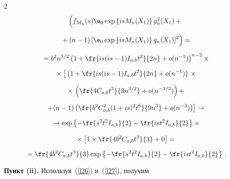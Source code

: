 \begin{multicols}{2}
\begin{multline*}
 \left(


 \vphantom{\left[X_1\right]^2}


 f_{M_n}(s) {\e}_0 \exp\left\{isM_n(X_1)\right\} g_n^2(X_1) +{}\right.\\[6pt]


\left. {}+ (n-1) \left[


 {\e}_0 \exp\left\{isM_n(X_1)\right\} g_n(X_1)\right]^2\right) ={}\\[6pt]


{}= b^2 n^{3/2} \left(1+\fr{is(is-1)\iab t^2}{2n}+  o(n^{-1})\right)^{n-2} \times{}\\[6pt]


{}


\times \left[


\vphantom{\left(\fr{b^2\cab^2 (1+is)^2t^6}{9n^3} +  o(n^{-3})\right)}


\left(1+\fr{is(is-1)\iab t^2}{2n}+  o(n^{-1})\right)\right.\times{}\\[6pt]


{}\times\left.


\left(\fr{4\cab t^3}{3n^{3/2}}+  o (n^{-3/2})\right) +\right.{}\\[6pt]


{}


\left.+ (n-1)\left(\fr{b^2\cab^2 (1+is)^2t^6}{9n^3} +  o(n^{-3})\right)\right] \to{}\\[6pt]


{}


\to \exp\left\{-\fr{s^2t^2\iab}{2}-\fr{ist^2\iab}{2}\right\} \times{}


\end{multline*}


\begin{multline*}


{}\times


\left[1 \times \fr{4b^2\cab t^3}{3} + 0\right] ={}\\[6pt]


{}


= \fr{4b^2\cab t^3}{3} \exp\left\{-\fr{s^2t^2\iab}{2}-\fr{ist^2\iab}{2}\right\}\,.


\end{multline*}





\medskip





\noindent\textbf{Пункт (ii).} Используя~(\ref{l26}) и~(\ref{l27}), получим



\end{multicols}
